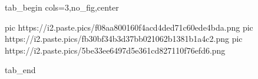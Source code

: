  
 
 
 
 


\ifcmt
  tab_begin cols=3,no_fig,center

     pic https://i2.paste.pics/f08aa800160f4acd4ded71c60ede4bda.png
		 pic https://i2.paste.pics/fb30bf34b3d37bb021062b1381b1a4c2.png
		 pic https://i2.paste.pics/5be33ee6497d5e361cd827110f76efd6.png

  tab_end
\fi
